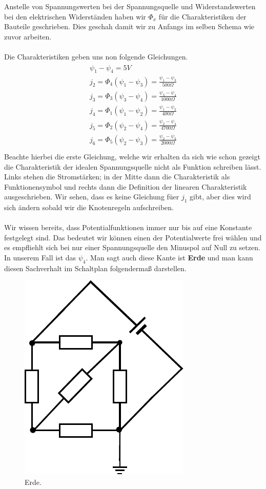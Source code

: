 \documentclass[11pt,a4paper,leqno]{report}
\numberwithin{equation}{chapter}
\begin{document}
\noindent
Anstelle von Spannungswerten bei der Spannungsquelle und Widerstandswerten bei den elektrischen Widerst\"anden haben wir $\Phi_x$ f\"ur die Charakteristiken der Bauteile geschrieben. Dies geschah damit wir zu Anfangs im selben Schema wie zuvor arbeiten. \\
\\
Die Charakteristiken geben uns non folgende Gleichungen.
\begin{align} 
\begin{split}
\psi_1 - \psi_4 = 5V\\
j_2 = \Phi_4(\psi_1 - \psi_3) = \frac{\psi_1 - \psi_3}{500\Omega}\\
j_3 = \Phi_3(\psi_3 - \psi_4) = \frac{\psi_3 - \psi_4}{1000\Omega}\\
j_4 = \Phi_1(\psi_1 - \psi_2) = \frac{\psi_1 - \psi_2}{400\Omega}\\
j_5 = \Phi_2(\psi_2 - \psi_4) = \frac{\psi_2 - \psi_4}{4700\Omega}\\
j_6 = \Phi_5(\psi_2 - \psi_3) = \frac{\psi_2 - \psi_3}{2000\Omega}\\
\end{split}
\end{align}
Beachte hierbei die erste Gleichung, welche wir erhalten da sich wie schon gezeigt die Charakteristik der idealen Spannungsquelle nicht als Funktion schreiben l\"asst. Links stehen die Stromst\"arken; in der Mitte dann die Charakteristik als Funktionensymbol und rechts dann die Definition der linearen Charakteristik ausgeschrieben. Wir sehen, dass es keine Gleichung f\"uer $j_1$ gibt, aber dies wird sich \"andern sobald wir die Knotenregeln aufschreiben.\\
\\
Wir wissen bereits, dass Potentialfunktionen immer nur bis auf eine Konstante festgelegt sind. Das bedeutet wir k\"onnen einen der Potentialwerte frei w\"ahlen und es empfliehlt sich bei nur einer Spannungsquelle den Minuspol auf Null zu setzen. In unserem Fall ist das $\psi_4$. Man sagt auch diese Kante ist \textbf{Erde} und man kann diesen Sachverhalt im Schaltplan folgenderma\ss{} darstellen.
\begin{figure}[H]
	\begin{center}
		\includegraphics[scale=0.8]{erde.pdf}
		\caption{Erde.}
	\end{center}
\end{figure}
\end{document}

